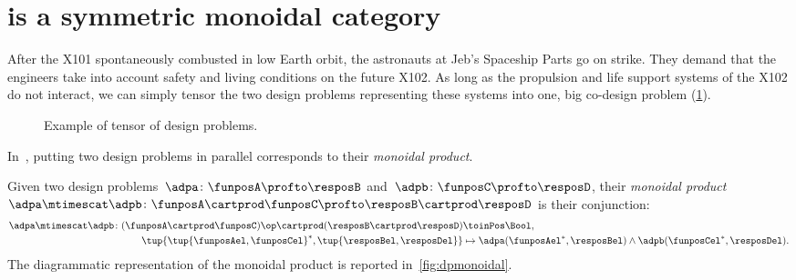 

\section{\DP is a symmetric monoidal category}\label{sec:parallelism-DP-monoidal}


\begin{example}
    After the X101 spontaneously combusted in low Earth orbit, the astronauts at Jeb's Spaceship Parts go on strike.
    They demand that the engineers take into account safety and living conditions on the future X102.
    As long as the propulsion and life support systems of the X102 do not interact, we can simply tensor the two design problems representing these systems into one, big co-design problem (\cref{fig:examplemonoidal}).
    \begin{figure}[h!]
        \centering
        \caption{Example of tensor of design problems. }
        \label{fig:examplemonoidal}
    \end{figure}
\end{example}
In~\DP, putting two design problems in parallel corresponds to their \emph{monoidal product}.

\begin{definition}
    \label{def:monoidalproduct}
    Given two design problems~$\adpa \colon \funposA \profto \resposB$ and~$\adpb \colon \funposC \profto \resposD$, their \emph{monoidal product}~$\adpa \mtimescat \adpb \colon \funposA \cartprod \funposC \profto \resposB\cartprod \resposD$ is their conjunction:
    \begin{equation}
        \label{eq:monoidalprod_dp}
        \begin{aligned}
            \adpa \mtimescat \adpb \colon (\funposA \cartprod \funposC)\op \cartprod (\resposB \cartprod \resposD) & \toinPos \Bool, \\
            \tup{\tup{\funposAel,\funposCel}^*,\tup{\resposBel,\resposDel}} &\mapsto \adpa(\funposAel^*,\resposBel) \wedge \adpb(\funposCel^*,\resposDel).
        \end{aligned}
    \end{equation}
    The diagrammatic representation of the monoidal product is reported in~\cref{fig:dpmonoidal}.
\end{definition}

